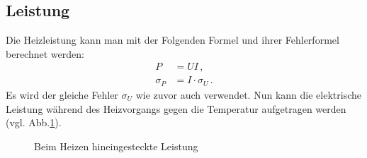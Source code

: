 \documentclass[12pt,a4paper,titlepage,headinclude,bibtotoc]{scrartcl}
\begin{document}
\subsection{Leistung}
Die Heizleistung kann man mit der Folgenden Formel und ihrer Fehlerformel berechnet werden:
\begin{align}
	P&=UI\,,\\
	\sigma_P&=I\cdot\sigma_U\,.
\end{align}
Es wird der gleiche Fehler $\sigma_U$ wie zuvor auch verwendet.
Nun kann die elektrische Leistung während des Heizvorgangs gegen die Temperatur aufgetragen werden (vgl. Abb.\ref{fig:Leistung}).
\begin{figure}[!htb]
	\centering
	
	\caption{Beim Heizen hineingesteckte Leistung}
	\label{fig:Leistung}
\end{figure}
\end{document}

